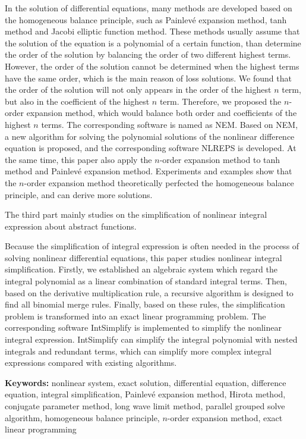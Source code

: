 In the solution of differential equations, many methods are developed based on the  homogeneous balance principle, such as Painlevé expansion method, tanh method and Jacobi elliptic function method. These methods usually assume that the solution of the equation is a polynomial of a certain function, than determine the order of the solution by balancing the order of two different highest terms. However, the order of the solution cannot be determined when the highest terms have the same order, which is the main reason of loss solutions. We found that the order of the solution will not only appears in the order of the highest $n$ term, but also in the coefficient of the highest $n$ term. Therefore, we proposed the $n$-order expansion method, which would balance both order and coefficients of the highest $n$ terms. The corresponding software is named as NEM.  Based on NEM, a new algorithm for solving the polynomial solutions of the nonlinear difference equation is proposed, and the corresponding software NLREPS is developed. At the same time, this paper also apply the $n$-order expansion method to tanh method and Painlevé expansion method. Experiments and examples show that the $n$-order expansion method theoretically perfected the homogeneous balance principle, and can derive more solutions.

The third part mainly studies on the simplification of nonlinear integral expression about abstract functions.

Because the simplification of integral expression is often needed in the process of solving nonlinear differential equations, this paper studies nonlinear integral simplification. Firstly, we established an algebraic system which  regard the integral polynomial as a linear combination of standard integral terms. Then, based on the derivative multiplication rule, a recursive algorithm is designed to find all binomial merge rules. Finally, based on these rules, the simplification problem is transformed into an exact linear programming problem. The corresponding software  IntSimplify is implemented to simplify the nonlinear integral expression. IntSimplify can simplify the integral polynomial with nested integrals and redundant terms, which can simplify more complex integral expressions compared with existing algorithms.

\bigskip
\noindent\textbf{ Keywords:}
nonlinear system, exact solution, differential equation, difference equation, integral simplification, Painlevé expansion method, Hirota method, conjugate parameter method, long wave limit method, parallel grouped solve algorithm, homogeneous balance principle, $n$-order expansion method, exact linear programming
